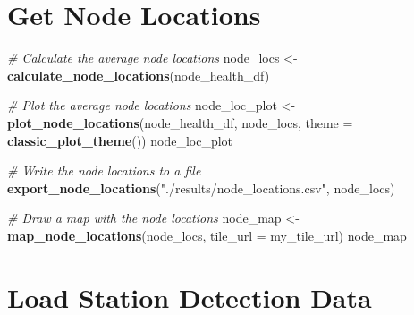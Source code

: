 \documentclass[
]{book}
\newenvironment{Shaded}{\begin{snugshade}}{\end{snugshade}}
\newcommand{\AttributeTok}[1]{\textcolor[rgb]{0.13,0.29,0.53}{#1}}
\newcommand{\CommentTok}[1]{\textcolor[rgb]{0.56,0.35,0.01}{\textit{#1}}}
\newcommand{\FunctionTok}[1]{\textcolor[rgb]{0.13,0.29,0.53}{\textbf{#1}}}
\newcommand{\NormalTok}[1]{#1}
\newcommand{\OtherTok}[1]{\textcolor[rgb]{0.56,0.35,0.01}{#1}}
\newcommand{\StringTok}[1]{\textcolor[rgb]{0.31,0.60,0.02}{#1}}
\begin{document}
\section{Get Node Locations}\label{get-node-locations-2}

\begin{Shaded}
\begin{Highlighting}[]
\CommentTok{\# Calculate the average node locations}
\NormalTok{node\_locs }\OtherTok{\textless{}{-}} \FunctionTok{calculate\_node\_locations}\NormalTok{(node\_health\_df)}

\CommentTok{\# Plot the average node locations}
\NormalTok{node\_loc\_plot }\OtherTok{\textless{}{-}} \FunctionTok{plot\_node\_locations}\NormalTok{(node\_health\_df,}
\NormalTok{                                     node\_locs,}
                                     \AttributeTok{theme =} \FunctionTok{classic\_plot\_theme}\NormalTok{())}
\NormalTok{node\_loc\_plot}

\CommentTok{\# Write the node locations to a file}
\FunctionTok{export\_node\_locations}\NormalTok{(}\StringTok{"./results/node\_locations.csv"}\NormalTok{, node\_locs)}

\CommentTok{\# Draw a map with the node locations}
\NormalTok{node\_map }\OtherTok{\textless{}{-}} \FunctionTok{map\_node\_locations}\NormalTok{(node\_locs, }\AttributeTok{tile\_url =}\NormalTok{ my\_tile\_url)}
\NormalTok{node\_map}
\end{Highlighting}
\end{Shaded}

\section{Load Station Detection Data}\label{load-station-detection-data-1}
\end{document}
